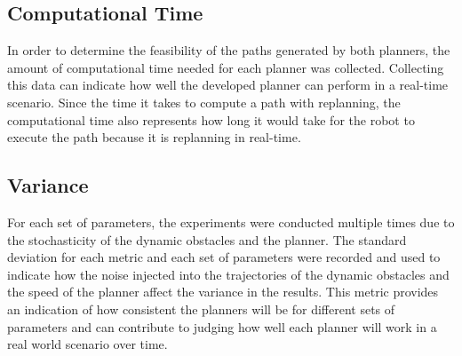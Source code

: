 \subsection{Computational Time}

In order to determine the feasibility of the paths generated by both planners,
the amount of computational time needed for each planner was collected.
Collecting this data can indicate how well the developed planner can perform in
a real-time scenario. Since the time it takes to compute a path with
replanning, the computational time also represents how long it would take for
the robot to execute the path because it is replanning in real-time.

\subsection{Variance}

For each set of parameters, the experiments were conducted multiple times due
to the stochasticity of the dynamic obstacles and the planner. The standard
deviation for each metric and each set of parameters were recorded and used to
indicate how the noise injected into the trajectories of the dynamic obstacles
and the speed of the planner affect the variance in the results. This metric
provides an indication of how consistent the planners will be for different
sets of parameters and can contribute to judging how well each planner will
work in a real world scenario over time.


